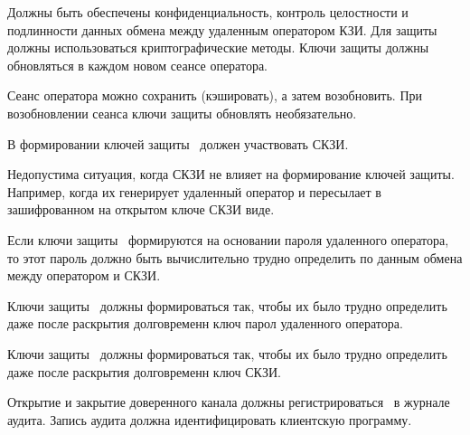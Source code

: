 \label{R.TC.Crypto} %
Должны быть обеспечены конфиденциальность, контроль целостности и подлинности 
данных обмена между удаленным оператором КЗИ.
%
Для защиты должны использоваться криптографические методы.
%
Ключи защиты должны обновляться в каждом новом сеансе оператора.

\begin{note}
Сеанс оператора можно сохранить (кэшировать), а затем возобновить.
При возобновлении сеанса ключи защиты обновлять необязательно.
\end{note}

\label{R.TC.Keys} %
В формировании ключей защиты~ должен участвовать СКЗИ.

\begin{note}
Недопустима ситуация, когда СКЗИ не влияет на формирование ключей защиты.
Например, когда их генерирует удаленный оператор и пересылает 
в зашифрованном на открытом ключе СКЗИ виде.
\end{note}

\label{R.TC.Pwd} %
Если ключи защиты~ формируются на основании пароля
удаленного оператора, то этот пароль должно быть вычислительно
трудно определить по данным обмена между оператором и СКЗИ.

\label{R.TC.FSWeak} %
Ключи защиты~ должны формироваться так, чтобы их было 
 трудно определить даже после раскрытия 
долговременн ключ  
парол удаленного оператора.

\label{R.TC.FS} %
Ключи защиты~ должны формироваться так, 
чтобы их было  трудно определить даже после 
раскрытия долговременн ключ СКЗИ.

\label{R.TC.AU} %
Открытие и закрытие доверенного канала должны регистрироваться~ 
в журнале аудита. Запись аудита должна идентифицировать клиентскую программу.



